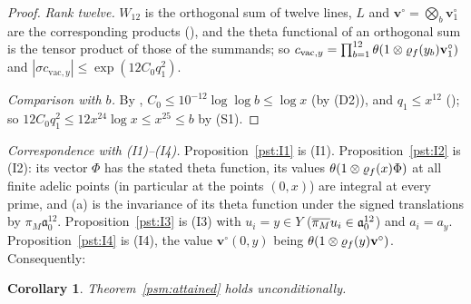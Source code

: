 \documentclass[10pt]{amsart}
\newtheorem{corollary}[theorem]{Corollary}
\theoremstyle{definition}
\theoremstyle{remark}
\providecommand{\psvac}{\mathbf v}
\begin{document}
\begin{proof}
\emph{Rank twelve.} $W_{12}$ is the orthogonal sum of twelve lines, $L$ and $\psvac^\circ=
\bigotimes_b\psvac^\circ_1$ are the corresponding products ({\cite[(58)]{P49}}), and the theta
functional of an orthogonal sum is the tensor product of those of the summands; so $c_{\mathrm{vac},y}=\prod_{b=1}
^{12}\theta(1\otimes\psrho_f(y_b)\psvac^\circ_1)$ and $|\sigma c_{\mathrm{vac},y}|\le\exp(12C_0q_1^2)$.

\emph{Comparison with $b$.} By {\cite[Lemma~8.7(c)]{P49}}, $C_0\le10^{-12}\log\log b\le\log x$ (by
(D2)), and $q_1\le x^{12}$ ({\cite[Lemma~13.4(S3)]{P46}}); so $12C_0q_1^2\le12x^{24}\log x\le
x^{25}\le b$ by (S1).
\end{proof}

\emph{Correspondence with (I1)--(I4).} Proposition~\ref{pst:I1} is (I1). Proposition~\ref{pst:I2}
is (I2): its vector $\Phi$ has the stated theta function, its values $\theta(1\otimes\psrho_f(x)
\Phi)$ at all finite adelic points (in particular at the points $(0,x)$) are integral at every
prime, and (a) is the invariance of its theta function under the signed translations by $\pi_M
\mathfrak a_0^{12}$. Proposition~\ref{pst:I3} is (I3) with $u_i=y\in Y$ ($\aubar{\pi_M}u_i\in
\mathfrak a_0^{12}$) and $a_i=a_y$. Proposition~\ref{pst:I4} is (I4), the value $\psvac^\circ(0,
y)$ being $\theta(1\otimes\psrho_f(y)\psvac^\circ)$. Consequently:

\begin{corollary}\label{pst:attained}
Theorem~\ref{psm:attained} holds unconditionally.
\end{corollary}




\providecommand{\auO}{\mathcal O}
\providecommand{\auU}{\mathrm U}
\providecommand{\auGL}{\mathrm{GL}}
\providecommand{\auHom}{\operatorname{Hom}}
\providecommand{\auAut}{\operatorname{Aut}}
\providecommand{\auNm}{\operatorname{Nm}}
\providecommand{\auA}{\mathbb A}
\providecommand{\auF}{\mathbb F}
\providecommand{\auPl}{\Phi}
\providecommand{\aubud}{\mathrm{bud}}
\providecommand{\ausinf}{s_\infty}
\providecommand{\ausfin}{s_{\mathrm{fin}}}
\providecommand{\aubar}[1]{\overline{#1}}
\providecommand{\plone}{\mathbf 1}
\providecommand{\psrho}{\varrho}
\providecommand{\psvac}{\mathbf v}
\providecommand{\poA}{\mathcal A}
\providecommand{\popr}{\operatorname{pr}}
\providecommand{\podel}{\delta}
\providecommand{\pop}{\mathsf p}
\providecommand{\pog}{\mathsf g}
\providecommand{\pexK}{K^{(z)}}
\providecommand{\psuC}{\mathcal C}
\providecommand{\psuT}{\mathsf T}
\providecommand{\psuN}{\mathsf N}
\providecommand{\psug}{\hat g}
\end{document}
